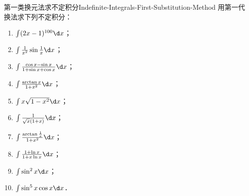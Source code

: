 \begin{problem}{第一类换元法求不定积分}{Indefinite-Integrals-First-Substitution-Method}
    用第一代换法求下列不定积分：
    \begin{enumerate}
        \item $\int (2x - 1)^{100} \d x$；
        \item $\int \frac{1}{x^2} \sin \frac{1}{x} \d x$；
        \item $\int \frac{\cos x - \sin x}{1 + \sin x + \cos x} \d x$；
        \item $\int \frac{\arctan x}{1 + x^2} \d x$；
        \item $\int x\sqrt{1 - x^2} \d x$；
        \item $\int \frac{1}{\sqrt{x}(1 + x)} \d x$；
        \item $\int \frac{\arctan \frac{1}{x}}{1 + x^2} \d x$；
        \item $\int \frac{1 + \ln x}{1 + x \ln x} \d x$；
        \item $\int \sin^2 x \d x$；
        \item $\int \sin^5 x \cos x \d x$．
    \end{enumerate}
\end{problem}

